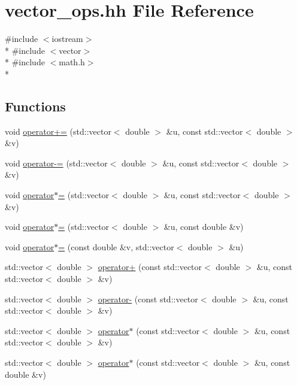 \hypertarget{vector__ops_8hh}{}\section{vector\+\_\+ops.\+hh File Reference}
\label{vector__ops_8hh}
{\ttfamily \#include $<$iostream$>$}\\*
{\ttfamily \#include $<$vector$>$}\\*
{\ttfamily \#include $<$math.\+h$>$}\\*
\subsection*{Functions}
\begin{DoxyCompactItemize}
\item 
void \hyperlink{vector__ops_8hh_adbc42bb6b72e7c57f961c77a042a9bff}{operator+=} (std\+::vector$<$ double $>$ \&u, const std\+::vector$<$ double $>$ \&v)
\item 
void \hyperlink{vector__ops_8hh_a6576381ebb1e650c757cee7003ec0468}{operator-\/=} (std\+::vector$<$ double $>$ \&u, const std\+::vector$<$ double $>$ \&v)
\item 
void \hyperlink{vector__ops_8hh_a13f188d3447fc14483c89d2e06f42593}{operator$\ast$=} (std\+::vector$<$ double $>$ \&u, const std\+::vector$<$ double $>$ \&v)
\item 
void \hyperlink{vector__ops_8hh_a7021d82502a83b43c2f507a185140c73}{operator$\ast$=} (std\+::vector$<$ double $>$ \&u, const double \&v)
\item 
void \hyperlink{vector__ops_8hh_ae5b19f02d09ffff2d2946aef833a7e5b}{operator$\ast$=} (const double \&v, std\+::vector$<$ double $>$ \&u)
\item 
std\+::vector$<$ double $>$ \hyperlink{vector__ops_8hh_adf96f73578c30d6bac57c6d86e7b1228}{operator+} (const std\+::vector$<$ double $>$ \&u, const std\+::vector$<$ double $>$ \&v)
\item 
std\+::vector$<$ double $>$ \hyperlink{vector__ops_8hh_af711199d09ab5891151290b824e3e967}{operator-\/} (const std\+::vector$<$ double $>$ \&u, const std\+::vector$<$ double $>$ \&v)
\item 
std\+::vector$<$ double $>$ \hyperlink{vector__ops_8hh_aa44eb5f612712ab822ca4c9dd6651430}{operator$\ast$} (const std\+::vector$<$ double $>$ \&u, const std\+::vector$<$ double $>$ \&v)
\item 
std\+::vector$<$ double $>$ \hyperlink{vector__ops_8hh_a5beadfe391c5fd61691c3903a72c10e7}{operator$\ast$} (const std\+::vector$<$ double $>$ \&u, const double \&v)

\end{DoxyCompactItemize}
